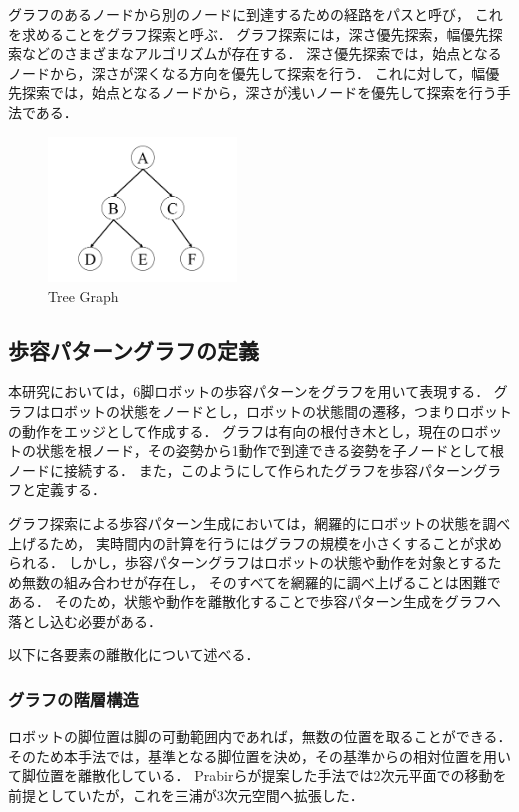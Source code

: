 グラフのあるノードから別のノードに到達するための経路をパスと呼び，
これを求めることをグラフ探索と呼ぶ．
グラフ探索には，深さ優先探索，幅優先探索などのさまざまなアルゴリズムが存在する．
深さ優先探索では，始点となるノードから，深さが深くなる方向を優先して探索を行う．
これに対して，幅優先探索では，始点となるノードから，深さが浅いノードを優先して探索を行う手法である．

\begin{figure}[htbp]
  \begin{center}
    \includegraphics[width=50mm, clip]{figure/tree_graph.png}
   \caption{Tree Graph}
   \label{fig:tree_graph}
  \end{center}
\end{figure}

\subsection{歩容パターングラフの定義}
本研究においては，6脚ロボットの歩容パターンをグラフを用いて表現する．
グラフはロボットの状態をノードとし，ロボットの状態間の遷移，つまりロボットの動作をエッジとして作成する．
グラフは有向の根付き木とし，現在のロボットの状態を根ノード，その姿勢から1動作で到達できる姿勢を子ノードとして根ノードに接続する．
また，このようにして作られたグラフを歩容パターングラフと定義する．

グラフ探索による歩容パターン生成においては，網羅的にロボットの状態を調べ上げるため，
実時間内の計算を行うにはグラフの規模を小さくすることが求められる．
しかし，歩容パターングラフはロボットの状態や動作を対象とするため無数の組み合わせが存在し，
そのすべてを網羅的に調べ上げることは困難である．
そのため，状態や動作を離散化することで歩容パターン生成をグラフへ落とし込む必要がある．

以下に各要素の離散化について述べる．

\subsubsection{グラフの階層構造}
ロボットの脚位置は脚の可動範囲内であれば，無数の位置を取ることができる．
そのため本手法では，基準となる脚位置を決め，その基準からの相対位置を用いて脚位置を離散化している．
Prabirらが提案した手法では2次元平面での移動を前提としていたが\cite{Prabir_Graph_search}，これを三浦が3次元空間へ拡張した\cite{Miura_Graph_search}．

